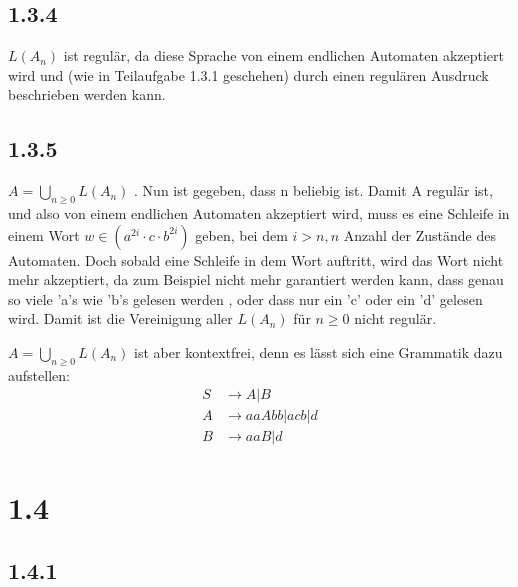 \documentclass{article}
\begin{document}
\subsection*{1.3.4}

$L(A_n)$ ist regulär, da diese Sprache von einem endlichen Automaten akzeptiert
wird und (wie in Teilaufgabe 1.3.1 geschehen) durch einen regulären Ausdruck
beschrieben werden kann.

\subsection*{1.3.5}
 
$A = \bigcup_{n \geq 0} L(A_n)$ . Nun ist gegeben, dass n beliebig ist. Damit A
regulär ist, und also von einem endlichen Automaten akzeptiert wird, muss es
eine Schleife in einem Wort $w \in (a^{2i}\cdot c\cdot b^{2i})$ geben, bei dem
$i > n, n$ Anzahl der Zustände des Automaten. Doch sobald eine Schleife in dem
Wort auftritt, wird das Wort nicht mehr akzeptiert, da zum Beispiel nicht mehr
garantiert werden kann, dass genau so viele 'a's wie 'b's gelesen werden , oder
dass nur ein 'c' oder ein 'd' gelesen wird. Damit ist die Vereinigung aller
$L(A_n)$ für $n \geq 0$ nicht regulär. 

$A = \bigcup_{n \geq 0} L(A_n)$ ist aber kontextfrei, denn es lässt sich eine
Grammatik dazu aufstellen: \begin{align*} S &\rightarrow A | B \\ A &\rightarrow
aaAbb | acb | d \\ B &\rightarrow aaB | d \end{align*}
 
\section*{1.4}
\subsection*{1.4.1}
\end{document}
